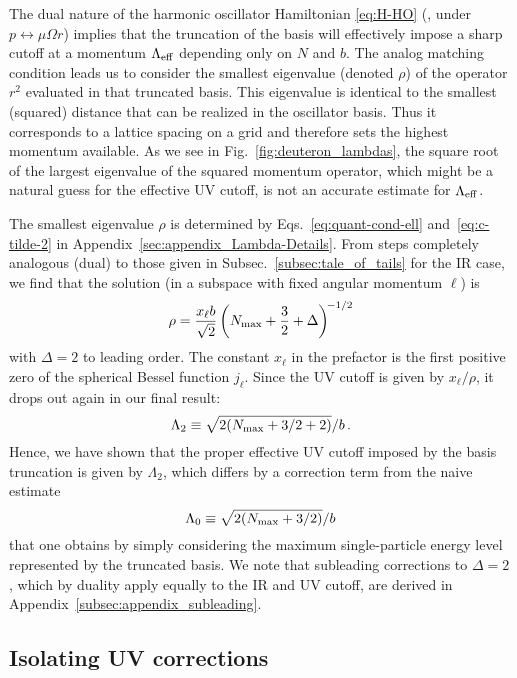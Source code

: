 	The dual nature of the harmonic oscillator Hamiltonian \eqref{eq:H-HO}
	(\ie, under $p \leftrightarrow \mu\Omega r$) implies that the
	truncation of the basis will effectively impose a sharp cutoff at a
	momentum $\Lambda_{\rm eff}$ depending only on $N$ and $b$.  The analog matching
	condition leads us to consider the smallest eigenvalue (denoted $\rho$) of
	the operator $r^2$ evaluated in that truncated basis.  This eigenvalue is
	identical to the smallest (squared) distance that can be realized in the
	oscillator basis.  Thus it corresponds to a lattice spacing on a grid
	and therefore sets the highest momentum available.  As we see
	in Fig.~\ref{fig:deuteron_lambdas}, the square root of the largest
	eigenvalue of the squared momentum operator, which might be a natural guess
	for the effective UV cutoff, is not an accurate estimate for $\Lambda_{\rm eff}$.

	The smallest eigenvalue $\rho$ is determined by Eqs.~\eqref{eq:quant-cond-ell}
	and~\eqref{eq:c-tilde-2} in Appendix~\ref{sec:appendix_Lambda-Details}.
	From steps completely analogous (dual) to those given in
	Subsec.~\ref{subsec:tale_of_tails} for the IR case, we find that
	the solution (in a subspace with fixed angular momentum $\ell$) is
	\begin{equation}
	 \rho = \frac{x_\ell b}{\sqrt2}\left({N_{\mathrm{max}}}+\frac32+\Delta\right)^{\!-1/2}
	\label{eq:rho-Nmax-Delta}
	\end{equation}
	with $\Delta=2$ to leading order.  The constant $x_\ell$ in the prefactor is
	the first positive zero of the spherical Bessel function $j_\ell$.  Since the
	UV cutoff is given by $x_\ell/\rho$, it drops out again in our final
	result:
	\begin{equation}
	\Lambda_2 \equiv \sqrt{2({N_{\mathrm{max}}}+3/2+2)}/b \,.
	\label{eq:Lambda-2-simple}
	\end{equation}
	Hence, we have shown that the proper effective UV cutoff imposed by
	the basis truncation is given by $\Lambda_2$, which differs by a correction
	term from the naive estimate
	\begin{equation}
	 \Lambda_0 \equiv \sqrt{2({N_{\mathrm{max}}}+3/2)}/b
	\label{eq:Lambda-0}
	\end{equation}
	that one obtains by simply considering the maximum single-particle energy
	level represented by the truncated basis.  We note that subleading corrections
	to $\Delta=2$, which by duality apply equally to the IR and UV cutoff, are
	derived in Appendix~\ref{subsec:appendix_subleading}.

	\subsection{Isolating UV corrections}

